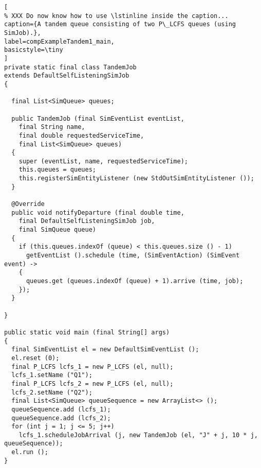 \documentclass[12pt]{book}
\begin{document}
\begin{lstlisting}[
% XXX Do now know how to use \lstinline inside the caption...
caption={A tandem queue consisting of two P\_LCFS queues (using SimJob).},
label=compExampleTandem1_main,
basicstyle=\tiny
]
private static final class TandemJob
extends DefaultSelfListeningSimJob
{

  final List<SimQueue> queues;
    
  public TandemJob (final SimEventList eventList,
    final String name,
    final double requestedServiceTime,
    final List<SimQueue> queues)
  {
    super (eventList, name, requestedServiceTime);
    this.queues = queues;
    this.registerSimEntityListener (new StdOutSimEntityListener ());
  }

  @Override
  public void notifyDeparture (final double time,
    final DefaultSelfListeningSimJob job,
    final SimQueue queue)
  {
    if (this.queues.indexOf (queue) < this.queues.size () - 1)
      getEventList ().schedule (time, (SimEventAction) (SimEvent event) ->
    {
      queues.get (queues.indexOf (queue) + 1).arrive (time, job);
    });
  }

}
  
public static void main (final String[] args)
{    
  final SimEventList el = new DefaultSimEventList ();
  el.reset (0);
  final P_LCFS lcfs_1 = new P_LCFS (el, null);
  lcfs_1.setName ("Q1");
  final P_LCFS lcfs_2 = new P_LCFS (el, null);
  lcfs_2.setName ("Q2");
  final List<SimQueue> queueSequence = new ArrayList<> ();
  queueSequence.add (lcfs_1);
  queueSequence.add (lcfs_2);
  for (int j = 1; j <= 5; j++)
    lcfs_1.scheduleJobArrival (j, new TandemJob (el, "J" + j, 10 * j, queueSequence));
  el.run ();
}
\end{lstlisting}
\end{document}
